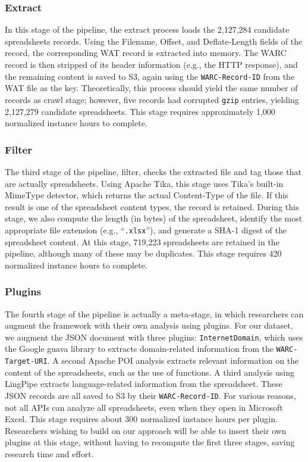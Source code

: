 \documentclass[conference]{IEEEtran}
\begin{document}
\subsubsection{Extract} 

In this stage of the pipeline, the extract process loads the 2,127,284 candidate spreadsheets records. Using the Filename, Offset, and Deflate-Length fields of the record, the corresponding WAT record is extracted into memory. The WARC record is then stripped of its header information (e.g., the HTTP response), and the remaining content is saved to S3, again using the \texttt{WARC-Record-ID} from the WAT file as the key. Theoretically, this process should yield the same number of records as crawl stage; however, five records had corrupted \texttt{gzip} entries, yielding 2,127,279 candidate spreadsheets. This stage requires approximately 1,000 normalized instance hours to complete.

\subsubsection{Filter} 

The third stage of the pipeline, filter, checks the extracted file and tag those that are actually spreadsheets. Using Apache Tika, this stage uses Tika's built-in MimeType detector, which returns the actual Content-Type of the file. If this result is one of the spreadsheet content types, the record is retained. During this stage, we also compute the length (in bytes) of the spreadsheet, identify the most appropriate file extension (e.g., ``\texttt{.xlsx}''), and generate a SHA-1 digest of the spreadsheet content.  At this stage, 719,223 spreadsheets are retained in the pipeline, although many of these may be duplicates. This stage requires 420 normalized instance hours to complete.

\subsubsection{Plugins} 

The fourth stage of the pipeline is actually a meta-stage, in which researchers can augment the framework with their own analysis using plugins. For our dataset, we augment the JSON document with three plugins: \texttt{InternetDomain}, which uses the Google guava library to extracts domain-related information from the \texttt{WARC-Target-URI}. A second Apache POI analysis extracts relevant information on the content of the spreadsheets, such as the use of functions. A third analysis using LingPipe extracts language-related information from the spreadsheet. These JSON records are all saved to S3 by their \texttt{WARC-Record-ID}. For various reasons, not all APIs can analyze all spreadsheets, even when they open in Microsoft Excel. This stage requires about 300 normalized instance hours per plugin. Researchers wishing to build on our approach will be able to insert their own plugins at this stage, without having to recompute the first three stages, saving research time and effort.
\end{document}
